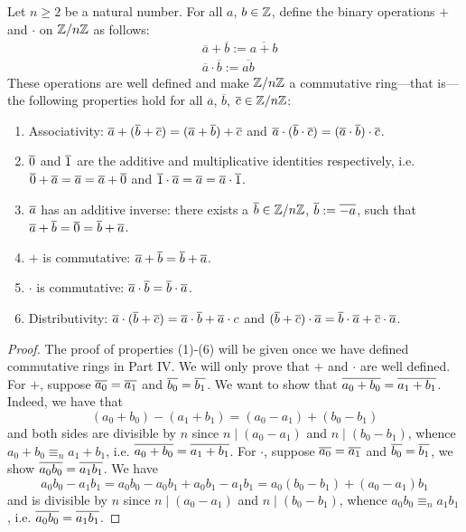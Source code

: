 \begin{thmbox}
  Let $n \geq 2$ be a natural number. For all $a$, $b \in \mathbb{Z}$, define the binary operations $+$ and $\cdot$ on $\mathbb{Z}/n\mathbb{Z}$ as follows:
  \begin{align*}
  &\overline{a} + \overline{b} := \overline{a + b} \\
  &\overline{a} \cdot \overline{b} := \overline{ab}
  \end{align*}
   These operations are well defined and make $\mathbb{Z}/n\mathbb{Z}$ a commutative ring---that is---the following properties hold for all $\overline{a}$, $\overline{b}$, $\overline{c} \in \mathbb{Z}/n\mathbb{Z}$:
   \begin{enumerate}[(1)]
      \item Associativity: $\overline{a} + (\overline{b} + \overline{c}) = (\overline{a} + \overline{b}) + \overline{c}$ and $\overline{a} \cdot (\overline{b} \cdot \overline{c}) = (\overline{a} \cdot \overline{b}) \cdot \overline{c}$. 
      \item $\overline{0}$ and $\overline{1}$ are the additive and multiplicative identities respectively, i.e. $\overline{0} + \overline{a} = \overline{a} = \overline{a} + \overline{0}$ and $\overline{1} \cdot \overline{a} = \overline{a} = \overline{a} \cdot \overline{1}$. 
      \item $\overline{a}$ has an additive inverse: there exists a $\overline{b} \in \mathbb{Z}/n\mathbb{Z}$, $\overline{b} := \overline{-a}$, such that $\overline{a} + \overline{b} = \overline{0} = \overline{b} + \overline{a}$.
      \item $+$ is commutative: $\overline{a} + \overline{b} = \overline{b} + \overline{a}$. 
      \item $\cdot$ is commutative: $\overline{a} \cdot \overline{b} = \overline{b} \cdot \overline{a}$. 
      \item Distributivity: $\overline{a} \cdot (\overline{b} + \overline{c}) = \overline{a} \cdot \overline{b} + \overline{a} \cdot {c}$ and $(\overline{b} + \overline{c}) \cdot \overline{a} = \overline{b} \cdot \overline{a} + \overline{c} \cdot \overline{a}$. 
   \end{enumerate}
\end{thmbox}
\begin{proof}
   The proof of properties (1)-(6) will be given once we have defined commutative rings in Part IV. We will only prove that $+$ and $\cdot$ are well defined. For $+$, suppose $\overline{a_0} = \overline{a_1}$ and $\overline{b_0} = \overline{b_1}$. We want to show that $\overline{a_0 + b_0} = \overline{a_1 + b_1}$. Indeed, we have that 
   \[ (a_0 + b_0) - (a_1 + b_1) = (a_0 - a_1) + (b_0 - b_1) \]
   and both sides are divisible by $n$ since $n \mid (a_0 - a_1)$ and $n \mid (b_0 - b_1)$, whence $a_0 + b_0 \equiv_n a_1 + b_1$, i.e. $\overline{a_0 + b_0} = \overline{a_1 + b_1}$. For $\cdot$, suppose $\overline{a_0} = \overline{a_1}$ and $\overline{b_0} = \overline{b_1}$, we show $\overline{a_0b_0} = \overline{a_1b_1}$. We have
   \[ a_0b_0 - a_1b_1 = a_0b_0 - a_0b_1 + a_0b_1 - a_1b_1 = a_0(b_0 - b_1) + (a_0 - a_1)b_1 \]
   and is divisible by $n$ since $n \mid (a_0 - a_1)$ and $n \mid (b_0 - b_1)$, whence $a_0b_0 \equiv_n a_1b_1$, i.e. $\overline{a_0b_0} = \overline{a_1b_1}$. 
\end{proof}
